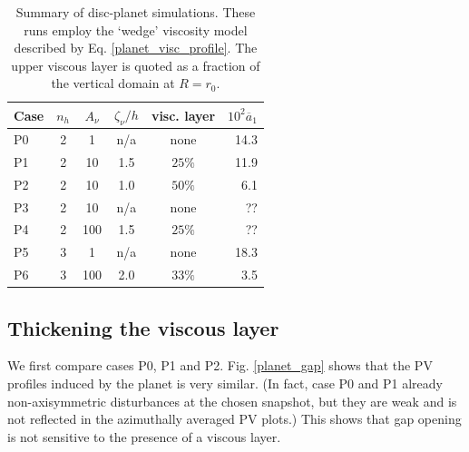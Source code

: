 
\begin{table}
  \centering
  \caption{Summary of disc-planet simulations. These runs employ the
    `wedge' viscosity model described by
    Eq. \ref{planet_visc_profile}. The upper viscous layer is
    quoted as a fraction of the vertical domain at 
    $R=r_0$. \label{planet_sims}}  
    \begin{tabular}{lccccr}
      \hline\hline
      Case & $n_h$ & $A_\nu$ &$\zeta_\nu/h$ & visc. layer& $10^2\overline{a}_1$ \\ 
      \hline
      P0 &  2     &    1    &    n/a      & none     &   14.3    \\%
      P1 &  2     &    10   &    1.5      & $25\%$  &    11.9     \\ 
      P2 &  2     &    10   &    1.0      & $50\%$  &    6.1      \\
      P3 &  2     &    10   &    n/a      & none    &    ??      \\
      P4&  2     &    100  &    1.5      & $25\%$  &    ??     \\
      P5 &  3     &    1    &     n/a      & none  &     18.3   \\
      P6 &  3     &    100   &    2.0      & $33\%$ &     3.5    \\
      \hline
  \end{tabular}
\end{table}

\subsection{Thickening the viscous layer}
We first compare cases P0, P1 and P2. Fig. \ref{planet_gap} 
shows that the PV profiles induced by the planet is very
similar. (In fact, case P0 and P1 already non-axisymmetric
disturbances at the chosen snapshot, but they are weak and is not
reflected in the azimuthally averaged PV plots.) This shows that gap
opening is not sensitive to the presence of a viscous layer.  

